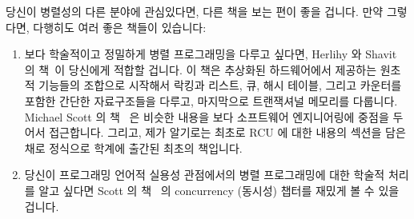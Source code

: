 \iffalse
As Knuth learned, if you want your book to be finite, it must be focused.
This book focuses on shared-memory parallel programming, with an
emphasis on software that lives near the bottom of the software stack,
such as operating-system kernels, parallel data-management systems,
low-level libraries, and the like.
The programming language used by this book is C.
\fi

당신이 병렬성의 다른 분야에 관심있다면, 다른 책을 보는 편이 좋을 겁니다.
만약 그렇다면, 다행히도 여러 좋은 책들이 있습니다:

\iffalse
If you are interested in other aspects of parallelism, you might well
be better served by some other book.
Fortunately, there are many alternatives available to you:
\fi

\begin{enumerate}
\item	보다 학술적이고 정밀하게 병렬 프로그래밍을 다루고 싶다면, Herlihy 와
	Shavit 의 책~\cite{HerlihyShavit2008Textbook}이 당신에게 적합할 겁니다.
	이 책은 추상화된 하드웨어에서 제공하는 원초적 기능들의 조합으로
	시작해서 락킹과 리스트, 큐, 해시 테이블, 그리고 카운터를 포함한 간단한
	자료구조들을 다루고, 마지막으로 트랜잭셔널 메모리를 다룹니다.  Michael
	Scott 의 책~\cite{MichaelScott2013Textbook} 은 비슷한 내용을 보다
	소프트웨어 엔지니어링에 중점을 두어서 접근합니다. 그리고, 제가 알기로는
	최초로 RCU 에 대한 내용의 섹션을 담은 채로 정식으로 학계에 출간된
	최초의 책입니다.

\iffalse
\item	If you prefer a more academic and rigorous treatment of
	parallel programming,
	you might like Herlihy's and Shavit's
	textbook~\cite{HerlihyShavit2008Textbook}.
	This book starts with an interesting combination
	of low-level primitives at high levels of abstraction
	from the hardware, and works its way through locking
	and simple data structures including lists, queues,
	hash tables, and counters, culminating with transactional
	memory.
	Michael Scott's textbook~\cite{MichaelScott2013Textbook}
	approaches similar material with more of a
	software-engineering focus, and, as far as I know, is
	the first formally published academic textbook to include a
	section devoted to RCU.
\fi

\item	당신이 프로그래밍 언어적 실용성 관점에서의 병렬 프로그래밍에 대한
	학술적 처리를 알고 싶다면 Scott 의 책~\cite{MichaelScott2006Textbook}
	의 concurrency (동시성) 챕터를 재밌게 볼 수 있을 겁니다.

\iffalse
\item	If you would like an academic treatment of parallel
	programming from a programming-language-pragmatics viewpoint,
	you might be interested in the concurrency chapter from Scott's
	textbook~\cite{MichaelScott2006Textbook}
	on programming-language pragmatics.
\fi


\end{enumerate}
